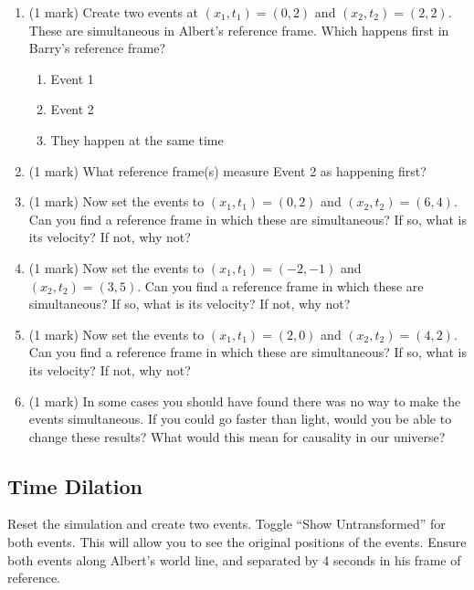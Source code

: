 \documentclass{article}
\begin{document}
\begin{enumerate}
\item (1 mark) Create two events at $(x_1,t_1)=(0,2)$ and $(x_2,t_2)=(2,2)$. These are simultaneous in Albert's reference frame. Which happens first in Barry's reference frame?
\begin{enumerate}
\item Event 1
\item Event 2
\item They happen at the same time
\end{enumerate}
\item (1 mark) What reference frame(s) measure Event 2 as happening first?
\vspace{2cm}

\item (1 mark) Now set the events to $(x_1,t_1)=(0,2)$ and $(x_2,t_2)=(6,4)$. Can you find a reference frame in which these are simultaneous? If so, what is its velocity? If not, why not?
\vspace{4cm}
\item (1 mark) Now set the events to $(x_1,t_1)=(-2,-1)$ and $(x_2,t_2)=(3,5)$. Can you find a reference frame in which these are simultaneous? If so, what is its velocity? If not, why not?
\vspace{4cm}
\item (1 mark) Now set the events to $(x_1,t_1)=(2,0)$ and $(x_2,t_2)=(4,2)$. Can you find a reference frame in which these are simultaneous? If so, what is its velocity? If not, why not?
\vspace{4cm}
\item (1 mark) In some cases you should have found there was no way to make the events simultaneous. If you could go faster than light, would you be able to change these results? What would this mean for causality in our universe?
\vspace{4cm}
\end{enumerate}


\subsection*{Time Dilation}
Reset the simulation and create two events. Toggle ``Show Untransformed'' for both events. This will allow you to see the original positions of the events. Ensure both events along Albert's world line, and separated by 4 seconds in his frame of reference.
\end{document}
